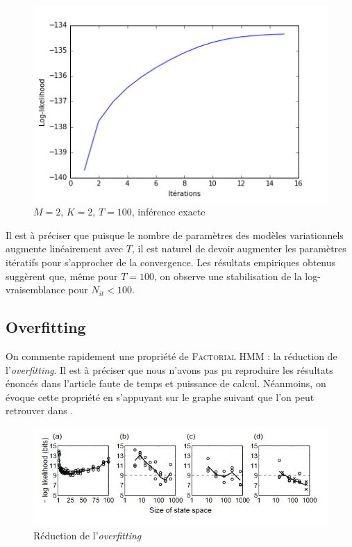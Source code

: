 \documentclass[10pt,a4paper]{article}
\newcommand{\fhmm}{\textsc{Factorial HMM}}
\begin{document}
 \begin{figure}[H]
\centering
\includegraphics[scale=0.3]{../resources/pictures/M2_K2_T100_exactinference.png}
\caption{$M=2$, $K=2$, $T=100$, inférence exacte}
\end{figure}

Il est à préciser que puisque le nombre de paramètres des modèles variationnels augmente linéairement
avec $T$, il est naturel de devoir augmenter les paramètres itératifs pour s'approcher de la convergence.
Les résultats empiriques obtenus suggèrent que, même pour $T=100$, on observe une stabilisation de la 
log-vraisemblance pour $N_{it}<100$.

\subsection{Overfitting}

On commente rapidement une propriété de \fhmm{} : la réduction de l'\textit{overfitting}. Il est à préciser que nous n'avons pas pu reproduire les résultats énoncés dans l'article \cite{ghahramani1997factorial} faute de temps et puissance de calcul. Néanmoins, on évoque cette propriété en s'appuyant sur le graphe suivant que l'on peut retrouver dans \cite{ghahramani1997factorial}.

\begin{figure}[H]
\centering
\includegraphics[scale=0.5]{../resources/pictures/overfitting_res.png}
\caption{Réduction de l'\textit{overfitting}}
\end{figure}
\end{document}
